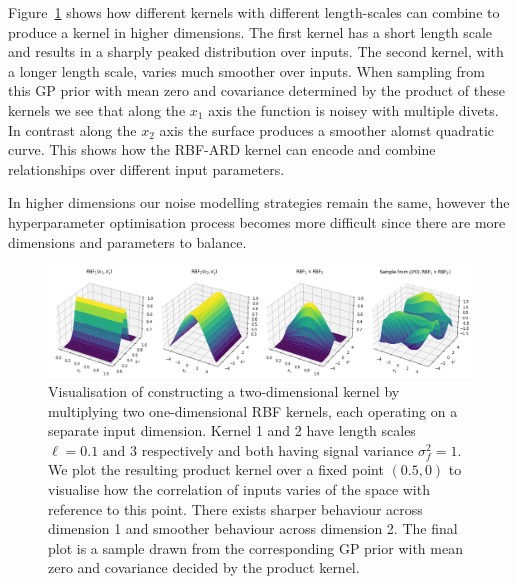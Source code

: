\documentclass{ucdgradtaughtthesis}
\begin{document}
Figure~\ref{fig:2dkernels} shows how different kernels with different length-scales can combine to produce a kernel in higher dimensions.
The first kernel has a short length scale and results in a sharply peaked distribution over inputs. The second kernel, with a longer length scale, varies much smoother over inputs.
When sampling from this GP prior with mean zero and covariance determined by the product of these kernels we see that along the \(x_1\) axis the function is noisey with multiple divets. 
In contrast along the \(x_2\) axis the surface produces a smoother alomst quadratic curve.
This shows how the RBF-ARD kernel can encode and combine relationships over different input parameters.

In higher dimensions our noise modelling strategies remain the same, however the hyperparameter optimisation process becomes more difficult since
there are more dimensions and parameters to balance.

\begin{figure}[H]
    \centering
    \includegraphics[width=\textwidth]{LatexPlots/final_gps_plots/2dkernels.png}
    \caption[Visualising the construction of a multi-dimensional kernel.]{
    Visualisation of constructing a two-dimensional kernel by multiplying two one-dimensional RBF kernels, each operating on a separate input dimension. Kernel 1 and 2 have length scales \(\ell = 0.1 \text{ and } 3\) respectively and both having signal variance \(\sigma_f^2 = 1\). 
    We plot the resulting product kernel over a fixed point \((0.5,0)\) to visualise how the correlation of inputs varies of the space with reference to this point.
    There exists sharper behaviour across dimension 1 and smoother behaviour across dimension 2. The final plot is a sample drawn from the corresponding GP prior with mean zero and covariance decided by the product kernel.}
    \label{fig:2dkernels}
\end{figure}
\end{document}

